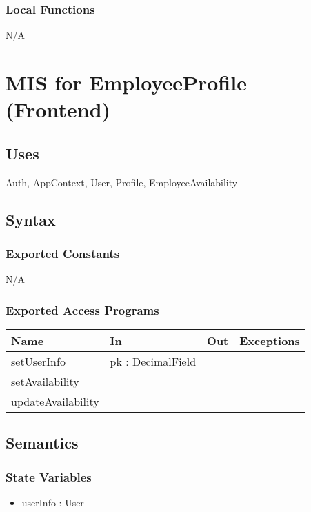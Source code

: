 \documentclass[12pt, titlepage]{article}
\begin{document}
        \subsubsection{Local Functions}
        N/A

\newpage
\section{MIS for EmployeeProfile (Frontend)}
    \subsection{Uses}
        Auth, AppContext, User, Profile, EmployeeAvailability
    \subsection{Syntax}
        \subsubsection{Exported Constants}
        N/A
        \subsubsection{Exported Access Programs}
            \begin{center}
                \begin{tabular}{p{3.5cm} p{4cm} p{2cm} p{2.5cm}}
                    \toprule
                    \textbf{Name} & \textbf{In} & \textbf{Out} & \textbf{Exceptions} \\
                    \midrule
                    setUserInfo & pk : DecimalField & & \\
                    setAvailability & & & \\
                    updateAvailability & & & \\
                    \bottomrule
                \end{tabular}
            \end{center}
    \subsection{Semantics}
        \subsubsection{State Variables}
            \begin{itemize}
                \item userInfo : User
            \end{itemize}
\end{document}
